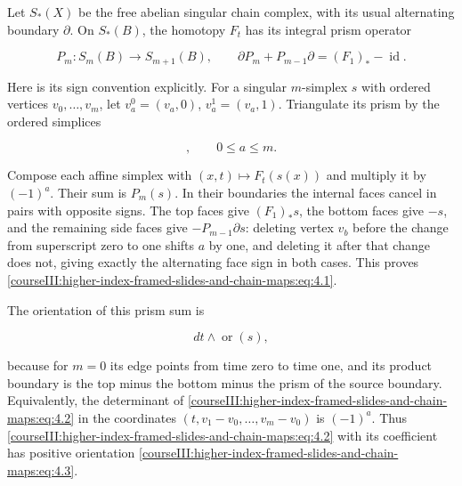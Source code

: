 \label{courseIII:higher-index-framed-slides-and-chain-maps:section-4}\label{courseIII:higher-slides:4}

Let \(S_*(X)\) be the free abelian singular chain complex, with its usual alternating boundary \(\partial\). On \(S_*(B)\), the homotopy \(F_t\) has its integral prism operator

\begin{equation}
P_m:S_m(B)\longrightarrow S_{m+1}(B),
 \qquad \partial P_m+P_{m-1}\partial=(F_1)_*-\operatorname{id}.
 \label{courseIII:higher-index-framed-slides-and-chain-maps:eq:4.1}
\end{equation}

Here is its sign convention explicitly. For a singular \(m\)-simplex \(s\) with ordered vertices \(v_0,\ldots,v_m\), let \(v_a^0=(v_a,0)\), \(v_a^1=(v_a,1)\). Triangulate its prism by the ordered simplices

\begin{equation}
[v_0^0,\ldots,v_a^0,v_a^1,\ldots,v_m^1],
 \qquad 0\leq a\leq m.
 \label{courseIII:higher-index-framed-slides-and-chain-maps:eq:4.2}
\end{equation}

Compose each affine simplex with \((x,t)\mapsto F_t(s(x))\) and multiply it by \((-1)^a\). Their sum is \(P_m(s)\). In their boundaries the internal faces cancel in pairs with opposite signs. The top faces give \((F_1)_*s\), the bottom faces give \(-s\), and the remaining side faces give \(-P_{m-1}\partial s\): deleting vertex \(v_b\) before the change from superscript zero to one shifts \(a\) by one, and deleting it after that change does not, giving exactly the alternating face sign in both cases. This proves \eqref{courseIII:higher-index-framed-slides-and-chain-maps:eq:4.1}.

The orientation of this prism sum is

\begin{equation}
dt\wedge\operatorname{or}(s),
 \label{courseIII:higher-index-framed-slides-and-chain-maps:eq:4.3}
\end{equation}

because for \(m=0\) its edge points from time zero to time one, and its product boundary is the top minus the bottom minus the prism of the source boundary. Equivalently, the determinant of \eqref{courseIII:higher-index-framed-slides-and-chain-maps:eq:4.2} in the coordinates \((t,v_1-v_0,\ldots,v_m-v_0)\) is \((-1)^a\). Thus \eqref{courseIII:higher-index-framed-slides-and-chain-maps:eq:4.2} with its coefficient has positive orientation \eqref{courseIII:higher-index-framed-slides-and-chain-maps:eq:4.3}.

